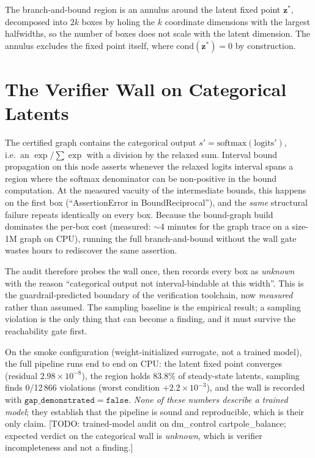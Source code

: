 \documentclass[journal]{IEEEtran}
\newcommand{\zdyn}{\boldsymbol{z}}
\newcommand{\stoch}{s}
\begin{document}
The branch-and-bound region is an annulus around the latent fixed point
$\zdyn^*$, decomposed into $2k$ boxes by holing the $k$ coordinate
dimensions with the largest halfwidths, so the number of boxes does not scale
with the latent dimension. The annulus excludes the fixed point itself,
where $\mathrm{cond}(\zdyn^*) = 0$ by construction.

\section{The Verifier Wall on Categorical Latents}
\label{sec:wall}

The certified graph contains the categorical output
$\stoch' = \mathrm{softmax}(\mathrm{logits}')$, i.e.\ an
$\exp / \sum \exp$ with a division by the relaxed sum. Interval bound
propagation on this node asserts whenever the relaxed logits interval spans a
region where the softmax denominator can be non-positive in the bound
computation. At the measured vacuity of the intermediate bounds, this
happens on the first box (``AssertionError in BoundReciprocal''), and the
\emph{same} structural failure repeats identically on every box. Because the
bound-graph build dominates the per-box cost (measured: $\sim$4 minutes for
the graph trace on a size-1M graph on CPU), running the full branch-and-bound
without the wall gate wastes hours to rediscover the same assertion.

The audit therefore probes the wall once, then records every box as
\emph{unknown} with the reason ``categorical output not interval-bindable at
this width''. This is the guardrail-predicted boundary of the verification
toolchain, now \emph{measured} rather than assumed. The sampling baseline is
the empirical result; a sampling violation is the only thing that can become
a finding, and it must survive the reachability gate first.

On the smoke configuration (weight-initialized surrogate, not a trained
model), the full pipeline runs end to end on CPU: the latent fixed point
converges (residual $2.98\times10^{-8}$), the region holds 83.8\% of
steady-state latents, sampling finds 0/12\,866 violations (worst condition
$+2.2\times10^{-3}$), and the wall is recorded with
$\texttt{gap\_demonstrated} = \mathtt{false}$. \emph{None of these numbers
describe a trained model}; they establish that the pipeline is sound and
reproducible, which is their only claim. [TODO: trained-model audit on
dm\_control cartpole\_balance; expected verdict on the categorical wall is
\emph{unknown}, which is verifier incompleteness and not a finding.]
\end{document}

